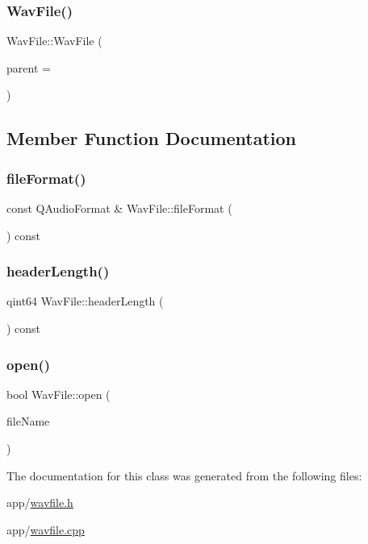 \subsubsection{\texorpdfstring{Wav\+File()}{WavFile()}}
{\footnotesize\ttfamily Wav\+File\+::\+Wav\+File (\begin{DoxyParamCaption}\item[{Q\+Object $\ast$}]{parent = {} }\end{DoxyParamCaption})}



\subsection{Member Function Documentation}
\hypertarget{class_wav_file_a9b2f3e3e7602540cda66562db243e332}{}\label{class_wav_file_a9b2f3e3e7602540cda66562db243e332} 
\subsubsection{\texorpdfstring{file\+Format()}{fileFormat()}}
{\footnotesize\ttfamily const Q\+Audio\+Format \& Wav\+File\+::file\+Format (\begin{DoxyParamCaption}{ }\end{DoxyParamCaption}) const}

\hypertarget{class_wav_file_a800a698411cfd6f5fdecc42beb053fb9}{}\label{class_wav_file_a800a698411cfd6f5fdecc42beb053fb9} 
\subsubsection{\texorpdfstring{header\+Length()}{headerLength()}}
{\footnotesize\ttfamily qint64 Wav\+File\+::header\+Length (\begin{DoxyParamCaption}{ }\end{DoxyParamCaption}) const}

\hypertarget{class_wav_file_a60680d00e08ed8ebbe33d624b6d0cd16}{}\label{class_wav_file_a60680d00e08ed8ebbe33d624b6d0cd16} 
\subsubsection{\texorpdfstring{open()}{open()}}
{\footnotesize\ttfamily bool Wav\+File\+::open (\begin{DoxyParamCaption}\item[{const Q\+String \&}]{file\+Name }\end{DoxyParamCaption})}



The documentation for this class was generated from the following files\+:\begin{DoxyCompactItemize}
\item 
app/\hyperlink{wavfile_8h}{wavfile.\+h}\item 
app/\hyperlink{wavfile_8cpp}{wavfile.\+cpp}\end{DoxyCompactItemize}
